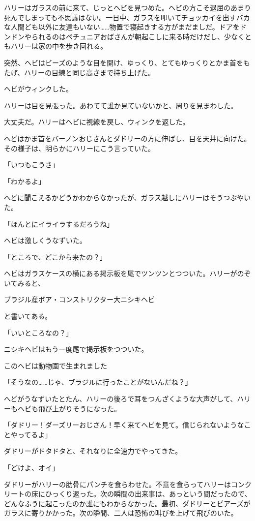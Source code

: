 \documentclass[10pt,a4paper]{article}
\begin{document}
\begin{CJK}{UTF8}{min}
ハリーはガラスの前に来て、じっとヘビを見つめた。ヘビの方こそ退屈のあまり死んでしまっても不思議はない。一日中、ガラスを叩いてチョッカイを出すバカな人間ども以外に友達もいない……物置で寝起きする方がまだましだ。ドアをドンドンやられるのはペチュニアおばさんが朝起こしに来る時だけだし、少なくともハリーは家の中を歩き回れる。

突然、ヘビはビーズのような目を開け、ゆっくり、とてもゆっくりとかま首をもたげ、ハリーの目線と同じ高さまで持ち上げた。

ヘビがウィンクした。

ハリーは目を見張った。あわてて誰か見ていないかと、周りを見まわした。

大丈夫だ。ハリーはヘビに視線を戻し、ウィンクを返した。

へどはかま首をバーノンおじさんとダドリーの方に伸ばし、目を天井に向けた。その様子は、明らかにハリーにこう言っていた。

「いつもこうさ」

「わかるよ」

へどに聞こえるかどうかわからなかったが、ガラス越しにハリーはそうつぶやいた。

「ほんとにイライラするだろうね」

ヘビは激しくうなずいた。

「ところで、どこから来たの？」

ヘビはガラスケースの横にある掲示板を尾でツンツンとつついた。ハリーがのぞいてみると、

ブラジル産ボア・コンストリクター大ニシキヘビ

と書いてある。

「いいところなの？」

ニシキヘビはもう一度尾で掲示板をつついた。

このヘビは動物園で生まれました

「そうなの……じゃ、ブラジルに行ったことがないんだね？」

へどがうなずいたとたん、ハリーの後ろで耳をつんざくような大声がして、ハリーもヘビも飛び上がりそうになった。

「ダドリー！ダーズリーおじさん！早く来てヘビを見て。信じられないようなことやってるよ」

ダドリーがドタドタと、それなりに全速力でやってきた。

「どけよ、オイ」

ダドリーがハリーの肋骨にパンチを食らわせた。不意を食らってハリーはコンクリートの床にひっくり返った。次の瞬間の出来事は、あっという間だったので、どんなふうに起こったのか誰にもわからなかった。最初、ダドリーとピアーズがガラスに寄りかかった。次の瞬間、二人は恐怖の叫びを上げて飛びのいた。


\end{CJK}
\end{document}
